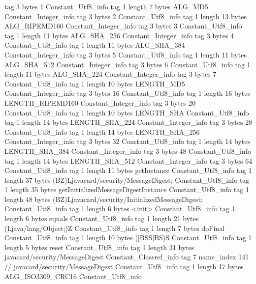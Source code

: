 {{{			tag	3
			bytes	1
		}
		Constant_Utf8_info {
			tag	1
			length	7
			bytes	ALG_MD5
		}
		Constant_Integer_info {
			tag	3
			bytes	2
		}
		Constant_Utf8_info {
			tag	1
			length	13
			bytes	ALG_RIPEMD160
		}
		Constant_Integer_info {
			tag	3
			bytes	3
		}
		Constant_Utf8_info {
			tag	1
			length	11
			bytes	ALG_SHA_256
		}
		Constant_Integer_info {
			tag	3
			bytes	4
		}
		Constant_Utf8_info {
			tag	1
			length	11
			bytes	ALG_SHA_384
		}
		Constant_Integer_info {
			tag	3
			bytes	5
		}
		Constant_Utf8_info {
			tag	1
			length	11
			bytes	ALG_SHA_512
		}
		Constant_Integer_info {
			tag	3
			bytes	6
		}
		Constant_Utf8_info {
			tag	1
			length	11
			bytes	ALG_SHA_224
		}
		Constant_Integer_info {
			tag	3
			bytes	7
		}
		Constant_Utf8_info {
			tag	1
			length	10
			bytes	LENGTH_MD5
		}
		Constant_Integer_info {
			tag	3
			bytes	16
		}
		Constant_Utf8_info {
			tag	1
			length	16
			bytes	LENGTH_RIPEMD160
		}
		Constant_Integer_info {
			tag	3
			bytes	20
		}
		Constant_Utf8_info {
			tag	1
			length	10
			bytes	LENGTH_SHA
		}
		Constant_Utf8_info {
			tag	1
			length	14
			bytes	LENGTH_SHA_224
		}
		Constant_Integer_info {
			tag	3
			bytes	28
		}
		Constant_Utf8_info {
			tag	1
			length	14
			bytes	LENGTH_SHA_256
		}
		Constant_Integer_info {
			tag	3
			bytes	32
		}
		Constant_Utf8_info {
			tag	1
			length	14
			bytes	LENGTH_SHA_384
		}
		Constant_Integer_info {
			tag	3
			bytes	48
		}
		Constant_Utf8_info {
			tag	1
			length	14
			bytes	LENGTH_SHA_512
		}
		Constant_Integer_info {
			tag	3
			bytes	64
		}
		Constant_Utf8_info {
			tag	1
			length	11
			bytes	getInstance
		}
		Constant_Utf8_info {
			tag	1
			length	37
			bytes	(BZ)Ljavacard/security/MessageDigest;
		}
		Constant_Utf8_info {
			tag	1
			length	35
			bytes	getInitializedMessageDigestInstance
		}
		Constant_Utf8_info {
			tag	1
			length	48
			bytes	(BZ)Ljavacard/security/InitializedMessageDigest;
		}
		Constant_Utf8_info {
			tag	1
			length	6
			bytes	<init>
		}
		Constant_Utf8_info {
			tag	1
			length	6
			bytes	equals
		}
		Constant_Utf8_info {
			tag	1
			length	21
			bytes	(Ljava/lang/Object;)Z
		}
		Constant_Utf8_info {
			tag	1
			length	7
			bytes	doFinal
		}
		Constant_Utf8_info {
			tag	1
			length	10
			bytes	([BSS[BS)S
		}
		Constant_Utf8_info {
			tag	1
			length	5
			bytes	reset
		}
		Constant_Utf8_info {
			tag	1
			length	31
			bytes	javacard/security/MessageDigest
		}
		Constant_Classref_info {
			tag	7
			name_index	141		// javacard/security/MessageDigest
		}
		Constant_Utf8_info {
			tag	1
			length	17
			bytes	ALG_ISO3309_CRC16
		}
		Constant_Utf8_info {
}}}
